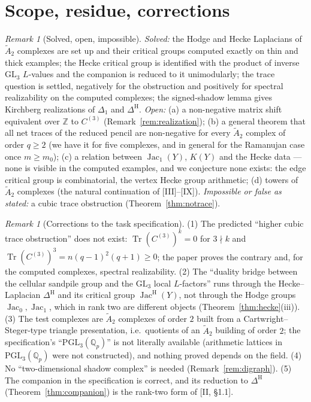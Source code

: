 \documentclass[11pt]{amsart}
\numberwithin{equation}{section}
\theoremstyle{definition}
\theoremstyle{remark}
\newtheorem{remark}[theorem]{Remark}
\newcommand{\Z}{\mathbb{Z}}
\newcommand{\Q}{\mathbb{Q}}
\newcommand{\Jac}{\operatorname{Jac}}
\newcommand{\Tr}{\operatorname{Tr}}
\newcommand{\PGL}{\mathrm{PGL}}
\newcommand{\Atwo}{\widetilde A_2}
\newcommand{\DeltaH}{\Delta^{\mathrm{H}}}
\newcommand{\JacH}{\Jac^{\mathrm{H}}}
\newcommand{\Cthree}{C^{(3)}}
\begin{document}
\section{Scope, residue, corrections}\label{sec:scope}

\begin{remark}[Solved, open, impossible]\label{rem:scope}
\emph{Solved:} the Hodge and Hecke Laplacians of $\Atwo$ complexes are set up and their
critical groups computed exactly on thin and thick examples; the Hecke critical group is
identified with the product of inverse $\mathrm{GL}_3$ $L$-values and the companion is
reduced to it unimodularly; the trace question is settled, negatively for the obstruction
and positively for spectral realizability on the computed complexes; the signed-shadow
lemma gives Kirchberg realizations of $\Delta_1$ and $\DeltaH$. \emph{Open:} (a) a non-negative
matrix shift equivalent over $\Z$ to $\Cthree$ (Remark~\ref{rem:realization}); (b) a
general theorem that all net traces of the reduced pencil are non-negative for every $\Atwo$
complex of order $q\ge2$ (we have it for five complexes, and in general for the Ramanujan
case once $m\ge m_0$); (c) a relation
between $\Jac_1(Y)$, $K(Y)$ and the Hecke data --- none is visible in the computed examples,
and we conjecture none exists: the edge critical group is combinatorial, the vertex Hecke
group arithmetic; (d) towers of $\Atwo$ complexes (the natural continuation of [III]--[IX]).
\emph{Impossible or false as stated:} a cubic trace obstruction (Theorem~\ref{thm:notrace}).
\end{remark}

\begin{remark}[Corrections to the task specification]\label{rem:corrections}
(1) The predicted ``higher cubic trace obstruction'' does not exist:
$\Tr(\Cthree)^{k}=0$ for $3\nmid k$ and $\Tr(\Cthree)^{3}=n(q-1)^{2}(q+1)\ge0$; the paper
proves the contrary and, for the computed complexes, spectral realizability. (2) The
``duality bridge between the cellular sandpile group and the $\mathrm{GL}_3$ local
$L$-factors'' runs through the Hecke--Laplacian $\DeltaH$ and its critical group $\JacH(Y)$, not
through the Hodge groups $\Jac_0,\Jac_1$, which in rank two are different objects
(Theorem~\ref{thm:hecke}(iii)). (3) The test complexes are $\Atwo$ complexes of order $2$
built from a Cartwright--Steger-type triangle presentation, i.e.\ quotients of an $\Atwo$
building of order $2$; the specification's ``$\PGL_3(\Q_p)$'' is not literally available
(arithmetic lattices in $\PGL_3(\Q_p)$ were not constructed), and nothing proved depends on
the field. (4) No ``two-dimensional shadow complex'' is needed
(Remark~\ref{rem:digraph}). (5) The companion in the specification is correct, and its
reduction to $\DeltaH$ (Theorem~\ref{thm:companion}) is the rank-two form of [II, \S1.1].
\end{remark}
\end{document}
